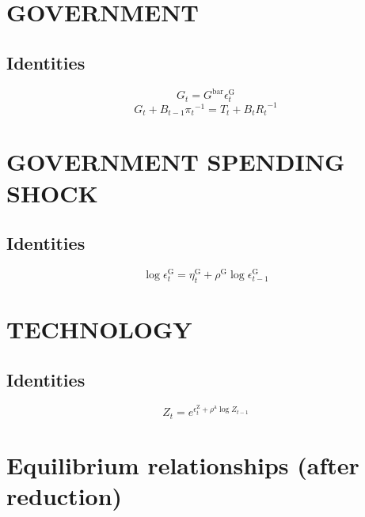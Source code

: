 \section{GOVERNMENT}

\subsection{Identities}

\begin{equation}
G_{t} = {G^{\mathrm{bar}}} {\epsilon^{\mathrm{G}}_{t}}
\end{equation}
\begin{equation}
G_{t} + {B_{t-1}} {\pi_{t}}^{-1} = T_{t} + {B_{t}} {R_{t}}^{-1}
\end{equation}




\section{GOVERNMENT SPENDING SHOCK}

\subsection{Identities}

\begin{equation}
\log{\epsilon^{\mathrm{G}}_{t}} = \eta^{\mathrm{G}}_{t} + {\rho^{\mathrm{G}}} {\log{\epsilon^{\mathrm{G}}_{t-1}}}
\end{equation}




\section{TECHNOLOGY}

\subsection{Identities}

\begin{equation}
Z_{t} = e^{\epsilon^{\mathrm{Z}}_{t} + {\rho^{\mathrm{a}}} {\log{Z_{t-1}}}}
\end{equation}




\section{Equilibrium relationships (after reduction)}

